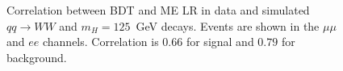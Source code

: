 \begin{figure}[!hbtp]
\centering
{}
\caption{Correlation between BDT and ME LR in data
and simulated $qq\rightarrow WW$ and $m_{H}=125$~GeV decays.
Events are shown in the $\mu\mu$ and $ee$ channels. Correlation is $0.66$ for signal and $0.79$ for background.}
\label{fig:me_correlations_sf}
\end{figure}

